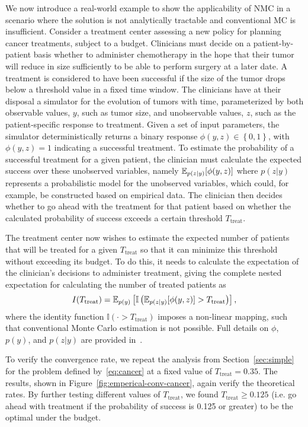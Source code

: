 We now introduce a real-world example to show the applicability of NMC in a scenario
where the solution is not analytically tractable and conventional MC is insufficient.
Consider a treatment center assessing a new policy for planning cancer treatments, subject to a budget. 
Clinicians must decide on a patient-by-patient basis whether to administer chemotherapy in the
hope that their tumor will reduce in size sufficiently to be able to perform surgery at a later date.
A treatment is considered to have been successful if the size of the tumor drops below a threshold value in a fixed time window.
The clinicians have at their disposal a simulator for the evolution of tumors with time,
parameterized by both observable values, $y$, such as tumor size, and unobservable values, $z$, such as the patient-specific response to treatment.
Given a set of input parameters, the simulator deterministically returns a binary response $\phi(y,z)\in\left\lbrace 0,1\right\rbrace $, with $\phi(y,z) = 1$ indicating a successful treatment.
To estimate the probability of a successful treatment for a given patient, the clinician must calculate the expected
success over these unobserved variables, namely $\mathbb{E}_{p(z|y)} [\phi(y,z)]$ where $p(z|y)$ represents a probabilistic
model for the unobserved variables, which could, for example, be constructed based on empirical data.
The clinician then decides whether to go ahead with the treatment for that
patient based on whether the calculated probability of success exceeds a certain threshold $T_{\mathrm{treat}}$.

The treatment center now wishes to estimate the expected number of patients that will be treated for a given $T_{\mathrm{treat}}$ so that it can minimize this threshold without exceeding its budget.
To do this, it needs to calculate the expectation of the clinician's decisions to administer 
treatment, giving the complete nested expectation for calculating the number of treated patients as
\begin{equation}
	\label{eq:cancer}
I(T_{\mathrm{treat}}) = \mathbb{E}_{p(y)} \left[\mathbb{I}\left(\mathbb{E}_{p(z|y)} [\phi(y,z)]>T_{\mathrm{treat}}\right)\right],
\end{equation}
where the identity function $\mathbb{I}(\cdot > T_{\mathrm{treat}})$ imposes a non-linear
mapping, such that conventional Monte Carlo estimation is not possible. Full details on $\phi$, $p(y)$, and $p(z|y)$ are 
provided in~\cite{rainforth2017pitfalls}.

To verify the convergence rate, we repeat the analysis from Section~\ref{sec:simple} for the problem defined 
by~\eqref{eq:cancer} at a fixed value of $T_{\mathrm{treat}}=0.35$. 
The results, shown in Figure~\ref{fig:emperical-conv-cancer}, again verify the theoretical rates. 
By further testing different values of $T_{\mathrm{treat}}$, we found $T_{\mathrm{treat}} \ge 0.125$ (i.e.
go ahead with treatment if the probability of success is 0.125 or greater) to be the optimal under the budget.

